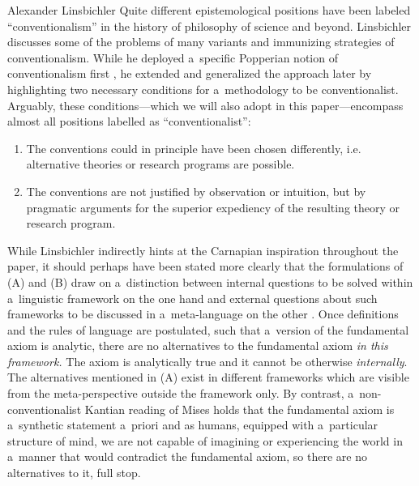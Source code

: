 \begin{artengenv}{Alexander Linsbichler}
Quite different epistemological positions have been labeled ``conventionalism'' in the history of philosophy of science and beyond. Linsbichler discusses some of the problems of many variants and immunizing strategies of conventionalism. While he deployed a~specific Popperian notion of conventionalism first 
\parencites[][]{linsbichler_was_2017}[][pp.367–511]{popper_two_2009}, %
 he extended and generalized the approach later 
\parencite[][]{linsbichler_austrian_2021} %
 by highlighting two necessary conditions for a~methodology to be conventionalist. Arguably, these conditions---which we will also adopt in this paper---encompass almost all positions labelled as ``conventionalist'':



\begin{enumerate}[label=(\Alph*)]
\item The conventions could in principle have been chosen differently, i.e. alternative theories or research programs are possible.
\item The conventions are not justified by observation or intuition, but by pragmatic arguments for the superior expediency of the resulting theory or research program. 
\parencite[][p.3371]{linsbichler_austrian_2021}%
\end{enumerate}

While Linsbichler 
\parencite*[][]{linsbichler_austrian_2021} %
 indirectly hints at the Carnapian inspiration throughout the paper, it should perhaps have been stated more clearly that the formulations of (A) and (B) draw on a~distinction between internal questions to be solved within a~linguistic framework on the one hand and external questions about such frameworks to be discussed in a~meta-language on the other 
\parencite[cf.][]{carnap_empiricism_1950}. %
 Once definitions and the rules of language are postulated, such that a~version of the fundamental axiom is analytic, there are no alternatives to the fundamental axiom \textit{in this framework.} The axiom is analytically true and it cannot be otherwise \textit{internally}. The alternatives mentioned in (A) exist in different frameworks which are visible from the meta-perspective outside the framework only. By contrast, a~non-conventionalist Kantian reading of Mises holds that the fundamental axiom is a~synthetic statement a~priori and as humans, equipped with a~particular structure of mind, we are not capable of imagining or experiencing the world in a~manner that would contradict the fundamental axiom, so there are no alternatives to it, full stop.




\end{artengenv}
